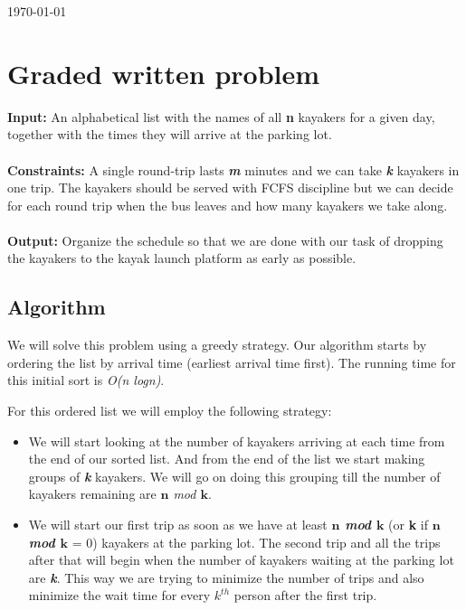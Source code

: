 \documentclass[8pt]{article}
\begin{document}
\hfill \small{\today} \\
\setlength{\fboxrule}{.5mm}\setlength{\fboxsep}{1.2mm}
\newlength{\boxlength}\setlength{\boxlength}{\textwidth}
\addtolength{\boxlength}{-4mm}
\begin{center}\end{center}
\vspace{5mm}

\section{Graded written problem}

\textbf{Input:} An alphabetical list with the names of all \textbf{n} kayakers for a given day, together with the times they will arrive at the parking lot.
\\ \\
\textbf{Constraints:} A single round-trip lasts \textit{\textbf{m}} minutes and we can take \textit{\textbf{k}} kayakers in one trip. The kayakers should be served with FCFS discipline but we can decide for each round trip when the bus leaves and how many kayakers we take along.
\\ \\
\textbf{Output:} Organize the schedule so that we are done with our task of dropping the kayakers to the kayak launch platform as early as possible.

\subsection{Algorithm}
We will solve this problem using a greedy strategy. Our algorithm starts by ordering the list by arrival time (earliest arrival time first). The running time for this initial sort is \textit{O(n logn)}.

For this ordered list we will employ the following strategy:
\begin{itemize}
    \item We will start looking at the number of kayakers arriving at each time from the end of our sorted list. And from the end of the list we start making groups of \textbf{\textit{k}} kayakers. We will go on doing this grouping till the number of kayakers remaining are \textit{$\textbf{n}$ mod $\textbf{k}$}.
    \item We will start our first trip as soon as we have at least \textbf{\textit{$\textbf{n}$ mod $\textbf{k}$}} (or \textbf{k} if \textbf{\textit{$\textbf{n}$ mod $\textbf{k}$}} = 0) kayakers at the parking lot. The second trip and all the trips after that will begin when the number of kayakers waiting at the parking lot are \textit{\textbf{k}}. This way we are trying to minimize the number of trips and also minimize the wait time for every \textbf{\textit{$k^{th}$}} person after the first trip.
\end{itemize}
\end{document}
